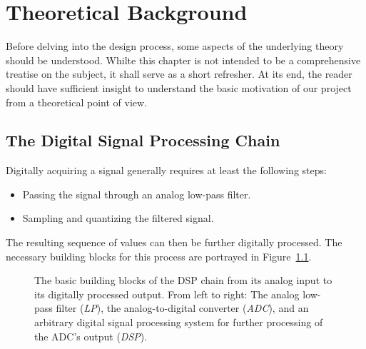 %
%
\chapter{Theoretical Background} %
\label{ch:theory}
%
%

Before  delving  into the  design  process,  some  aspects of  the  underlying
theory should  be understood.   Whilte this  chapter is not  intended to  be a
comprehensive treatise on the subject, it shall serve as a short refresher. At
its end,  the reader should  have sufficient  insight to understand  the basic
motivation of our project from a theoretical point of view.

%
%
\section{The Digital Signal Processing Chain}%
\label{sec:dsp_chain}

Digitally acquiring a signal generally requires at least the following steps:
\begin{itemize}\tightlist
        \item
            Passing the signal through an analog low-pass filter.
        \item
            Sampling and quantizing the filtered signal.
\end{itemize}

The   resulting   sequence  of   values   can   then  be   further   digitally
processed. The necessary  building blocks  for this  process are  portrayed in
Figure~\ref{fig:dspChain:blocks}.

\begin{figure}
    \centering
    
    \caption[The DSP Chain]{%
        The  basic  building   blocks  of  the  DSP  chain   from  its  analog
        input  to its  digitally processed  output.  From  left to  right: The
        analog  low-pass filter  (\emph{LP}), the  analog-to-digital converter
        (\emph{ADC}), and  an arbitrary  digital signal processing  system for
        further processing of the ADC's output (\emph{DSP}).%
    }
    \label{fig:dspChain:blocks}
\end{figure}

